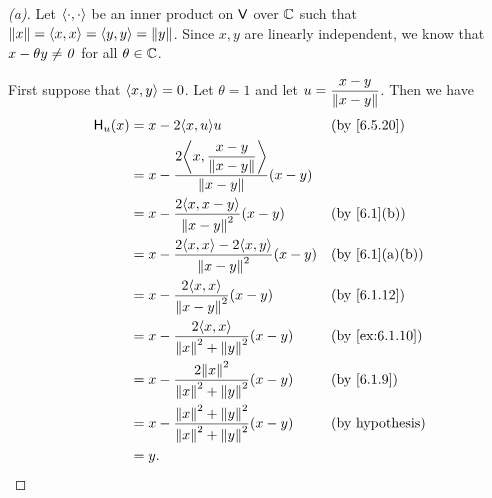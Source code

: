 \begin{proof}[(a)]
  Let \(\left\langle\cdot, \cdot\right\rangle\) be an inner product on \(\mathsf{V}\) over \(\mathbb{C}\) such that \(\left\lVert x\right\rVert = \left\langle x, x\right\rangle = \left\langle y, y\right\rangle = \left\lVert y\right\rVert\).
  Since \(x, y\) are linearly independent, we know that \(x - \theta y \neq \mathit{0}\) for all \(\theta \in \mathbb{C}\).

  First suppose that \(\left\langle x, y\right\rangle = 0\).
  Let \(\theta = 1\) and let \(u = \dfrac{x - y}{\left\lVert x- y\right\rVert}\).
  Then we have
  \begin{align*}
    \lt{H}_u(x) & = x - 2 \inn{x, u} u                                                       &  & \by{6.5.20}            \\
                & = x - \dfrac{2 \inn{x, \dfrac{x - y}{\norm{x - y}}}}{\norm{x - y}} (x - y)                             \\
                & = x - \dfrac{2 \inn{x, x - y}}{\norm{x - y}^2} (x - y)                     &  & \by{6.1}[b]            \\
                & = x - \dfrac{2 \inn{x, x} - 2 \inn{x, y}}{\norm{x - y}^2} (x - y)          &  & \by{6.1}[a,b]          \\
                & = x - \dfrac{2 \inn{x, x}}{\norm{x - y}^2} (x - y)                         &  & \by{6.1.12}            \\
                & = x - \dfrac{2 \inn{x, x}}{\norm{x}^2 + \norm{y}^2} (x - y)                &  & \by{ex:6.1.10}         \\
                & = x - \dfrac{2 \norm{x}^2}{\norm{x}^2 + \norm{y}^2} (x - y)                &  & \by{6.1.9}             \\
                & = x - \dfrac{\norm{x}^2 + \norm{y}^2}{\norm{x}^2 + \norm{y}^2} (x - y)     &  & \text{(by hypothesis)} \\
                & = y.
  \end{align*}


\end{proof}
